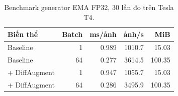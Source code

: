 \begin{table}[htbp]
\centering\small
\caption{Benchmark generator EMA FP32, 30 lần đo trên Tesla T4.}\label{tab:A2bench}
\begin{lrbox}{\reporttable}\begin{tabular}{lrrrr}
\toprule
Biến thể & Batch & ms/ảnh & ảnh/s & MiB \\
\midrule
Baseline & 1 & 0.989 & 1010.7 & 15.03 \\
Baseline & 64 & 0.277 & 3614.5 & 100.35 \\
+ DiffAugment & 1 & 0.947 & 1055.7 & 15.03 \\
+ DiffAugment & 64 & 0.286 & 3495.9 & 100.35 \\
\bottomrule
\end{tabular}\end{lrbox}
\ifdim\wd\reporttable>\linewidth\resizebox{\linewidth}{!}{\usebox{\reporttable}}\else\usebox{\reporttable}\fi
\end{table}
